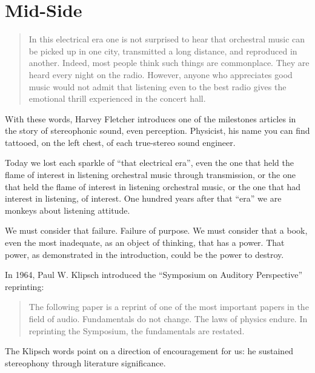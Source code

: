 \documentclass{article}
\begin{document}
%


\section{Mid-Side}
\label{sec:midside}

\begin{quotation}
In this electrical era one is not surprised to hear that orchestral music can be picked up in one city, transmitted a long distance, and reproduced in another. Indeed, most people think such things are commonplace. They are heard every night on the radio. However, anyone who appreciates good music would not admit that listening even to the best radio gives the emotional thrill experienced in the concert hall. \cite{hf34}
\end{quotation}

With these words, Harvey Fletcher introduces one of the milestones articles in the story of stereophonic sound, even perception. Physicist, his name you can find tattooed, on the left chest, of each true-stereo sound engineer. 

Today we lost each sparkle of “that electrical era”, even the one that held the flame of interest in listening orchestral music through transmission, or the one that held the flame of interest in listening orchestral music, or the one that had interest in listening, of interest. One hundred years after that “era” we are monkeys about listening attitude. 

We must consider that failure. Failure of purpose. We must consider that a book, even the most inadequate, as an object of thinking, that has a power. That power, as demonstrated in the introduction, could be the power to destroy. 

In 1964, Paul W. Klipsch introduced the “Symposium on Auditory Perspective” reprinting:

\begin{quotation}
The following paper is a reprint of one of the most important papers in the field of audio. Fundamentals do not change. The laws of physics endure. In reprinting the Symposium, the fundamentals are restated. \cite{sap1964}
\end{quotation}

The Klipsch words point on a direction of encouragement for us: he sustained stereophony through literature significance. 
\end{document}
